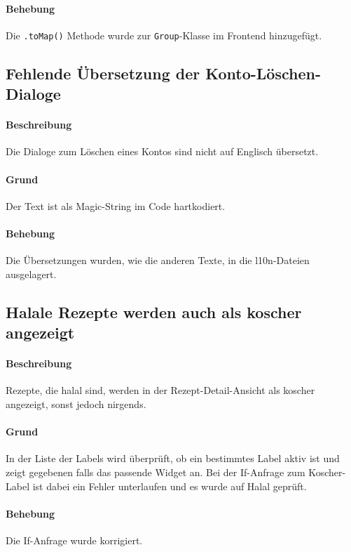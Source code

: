 \documentclass{qualitätssicherungsheft}
\begin{document}
\paragraph{Behebung} Die \texttt{.toMap()} Methode wurde zur \texttt{Group}-Klasse im Frontend hinzugefügt.
\newpage
\subsection{Fehlende Übersetzung der Konto-Löschen-Dialoge}
\paragraph*{Beschreibung} Die Dialoge zum Löschen eines Kontos sind nicht auf Englisch übersetzt.
\paragraph{Grund} Der Text ist als Magic-String im Code hartkodiert.
\paragraph{Behebung} Die Übersetzungen wurden, wie die anderen Texte, in die l10n-Dateien ausgelagert.
\newpage
\subsection{Halale Rezepte werden auch als koscher angezeigt}
\paragraph*{Beschreibung} Rezepte, die halal sind, werden in der Rezept-Detail-Ansicht als koscher angezeigt, sonst jedoch nirgends.
\paragraph{Grund} In der Liste der Labels wird überprüft, ob ein bestimmtes Label aktiv ist und zeigt gegebenen falls das passende Widget an. Bei der If-Anfrage zum Koscher-Label ist dabei ein Fehler unterlaufen und es wurde auf Halal geprüft.
\paragraph{Behebung} Die If-Anfrage wurde korrigiert.
\newpage
\end{document}

